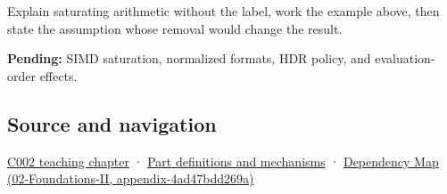 Explain saturating arithmetic without the label, work the example above, then state the assumption whose removal would change the result.

\textbf{Pending:} SIMD saturation, normalized formats, HDR policy, and evaluation-order effects.

\subsection{Source and navigation}\label{appendix-3999c6209649-source-and-navigation}

\hyperref[01-foundations-i-ch001-arithmetic-becomes-a-policy]{C002 teaching chapter} · \hyperref[appendix-fd090d982a15]{Part definitions and mechanisms} · \href{../02-Foundations-II/main.pdf\#nameddest=appendix-4ad47bdd269a}{Dependency Map (02-Foundations-II, appendix-4ad47bdd269a)}
